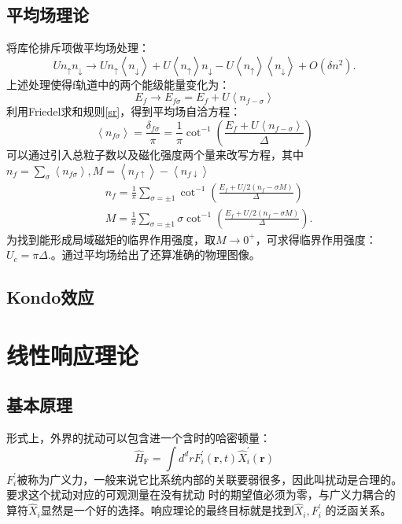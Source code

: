 \documentclass[10pt, a4paper, oneside]{ctexbook}
\begin{document}
	\subsection*{平均场理论}
	将库伦排斥项做平均场处理：
	\begin{equation}
		U n_{\uparrow} n_{\downarrow} \rightarrow U n_{\uparrow}\left\langle n_{\downarrow}\right\rangle+U\left\langle n_{\uparrow}\right\rangle n_{\downarrow}-U\left\langle n_{\uparrow}\right\rangle\left\langle n_{\downarrow}\right\rangle+O\left(\delta n^2\right) .
	\end{equation}
	上述处理使得f轨道中的两个能级能量变化为：
	\begin{equation}
		E_f \rightarrow E_{f \sigma}=E_f+U\left\langle n_{f-\sigma}\right\rangle
	\end{equation}
	利用Friedel求和规则\eqref{sr}，得到平均场自洽方程：
	\begin{equation}
		\left\langle n_{f \sigma}\right\rangle=\frac{\delta_{f \sigma}}{\pi}=\frac{1}{\pi} \cot ^{-1}\left(\frac{E_f+U\left\langle n_{f-\sigma}\right\rangle}{\Delta}\right)
	\end{equation}
	可以通过引入总粒子数以及磁化强度两个量来改写方程，其中$ n_f=\sum_\sigma\left\langle n_{f \sigma}\right\rangle,M=\left\langle n_{f \uparrow}\right\rangle- \left\langle n_{f \downarrow}\right\rangle$ 
	\begin{equation}
		\begin{aligned}
			& n_f=\frac{1}{\pi} \sum_{\sigma= \pm 1} \cot ^{-1}\left(\frac{E_f+U / 2\left(n_f-\sigma M\right)}{\Delta}\right) \\
			& M=\frac{1}{\pi} \sum_{\sigma= \pm 1} \sigma \cot ^{-1}\left(\frac{E_f+U / 2\left(n_f-\sigma M\right)}{\Delta}\right) .
			\end{aligned}
	\end{equation}
	为找到能形成局域磁矩的临界作用强度，取$ M \rightarrow 0^{+} $，可求得临界作用强度：$ U_c=\pi \Delta . $。通过平均场给出了还算准确的物理图像。
	\subsection*{Kondo效应}
	
	\section{线性响应理论}
	\subsection{基本原理}
	形式上，外界的扰动可以包含进一个含时的哈密顿量：
	\begin{equation}
		\hat{H}_{\mathrm{F}}=\int d^d r F_i^{\prime}(\mathbf{r}, t) \hat{X}_i^{\prime}(\mathbf{r})
	\end{equation}
	$ F_i^{\prime} $被称为广义力，一般来说它比系统内部的关联要弱很多，因此叫扰动是合理的。要求这个扰动对应的可观测量在没有扰动
	时的期望值必须为零，与广义力耦合的算符$ \hat{X}_i $显然是一个好的选择。响应理论的最终目标就是找到$ \hat{X}_i,F_i^{\prime} $
	的泛函关系。\\
\end{document}
